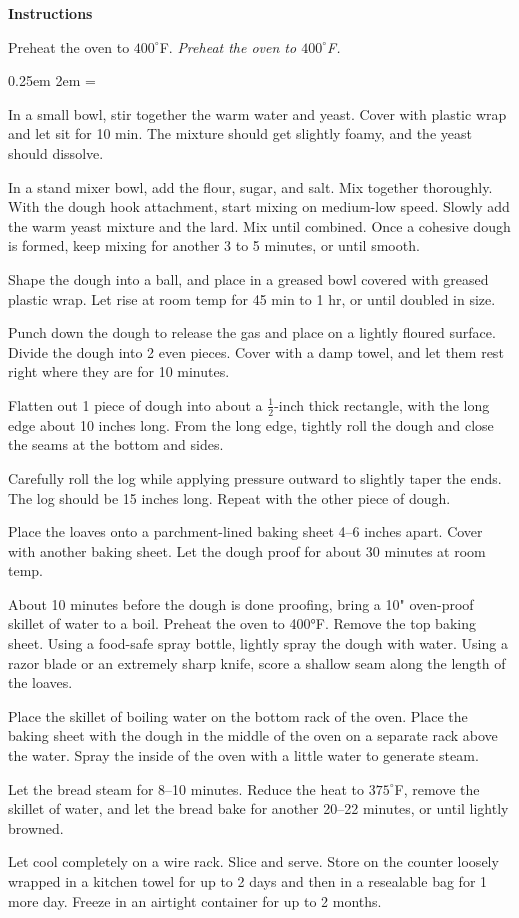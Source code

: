 \documentclass{article}
\newcommand{\temp}[1]{$#1^\circ$F}
\newcommand{\showit}[3][1in]{
    \begin{center}
        \bigskip
            \texttt{[image: \#2]}
            \par
            \medskip
            \testoneline{#3}
            \par
    \end{center}
}
\newcounter{stepnum}
\newenvironment{method}[1][]{%
    \setcounter{stepnum}{0}
    \noindent
    {\color{red}\Large\textbf{Instructions}}%
    \par
    \smallskip
    \if#1
    \else
        \noindent
        \emph{#1}
        \par
    \fi
    \begingroup
    \parindent0pt
    \parskip0.25em
        \leftskip2em
    \everypar={\llap{\stepcounter{stepnum}\hbox to2em{\thestepnum.\hfill}}}
}{%
    \par
    \endgroup
}
\begin{document}
\begin{method}[Preheat the oven to \temp{400}.]
    In a small bowl, stir together the warm water and yeast. Cover with plastic wrap and let sit for 10 min. The mixture should get slightly foamy, and the yeast should dissolve.\par
    In a stand mixer bowl, add the flour, sugar, and salt. Mix together thoroughly. With the dough hook attachment, start mixing on medium-low speed. Slowly add the warm yeast mixture and the lard. Mix until combined. Once a cohesive dough is formed, keep mixing for another 3 to 5 minutes, or until smooth.\par
    Shape the dough into a ball, and place in a greased bowl covered with greased plastic wrap. Let rise at room temp for 45 min to 1 hr, or until doubled in size.\par
    Punch down the dough to release the gas and place on a lightly floured surface. Divide the dough into 2 even pieces. Cover with a damp towel, and let them rest right where they are for 10 minutes.\par
    Flatten out 1 piece of dough into about a $\frac{1}{2}$-inch thick rectangle, with the long edge about 10 inches long. From the long edge, tightly roll the dough and close the seams at the bottom and sides.\par
    Carefully roll the log while applying pressure outward to slightly taper the ends. The log should be 15 inches long. Repeat with the other piece of dough.\par
    Place the loaves onto a parchment-lined baking sheet 4--6 inches apart. Cover with another baking sheet. Let the dough proof for about 30 minutes at room temp.\par
    About 10 minutes before the dough is done proofing, bring a 10" oven-proof skillet of water to a boil. Preheat the oven to 400°F. Remove the top baking sheet. Using a food-safe spray bottle, lightly spray the dough with water. Using a razor blade or an extremely sharp knife, score a shallow seam along the length of the loaves.\par
    Place the skillet of boiling water on the bottom rack of the oven. Place the baking sheet with the dough in the middle of the oven on a separate rack above the water. Spray the inside of the oven with a little water to generate steam.\par
    Let the bread steam for 8--10 minutes. Reduce the heat to \temp{375}, remove the skillet of water, and let the bread bake for another 20--22 minutes, or until lightly browned.\par
    Let cool completely on a wire rack. Slice and serve. Store on the counter loosely wrapped in a kitchen towel for up to 2 days and then in a resealable bag for 1 more day. Freeze in an airtight container for up to 2 months.\par
\end{method}
\end{document}

